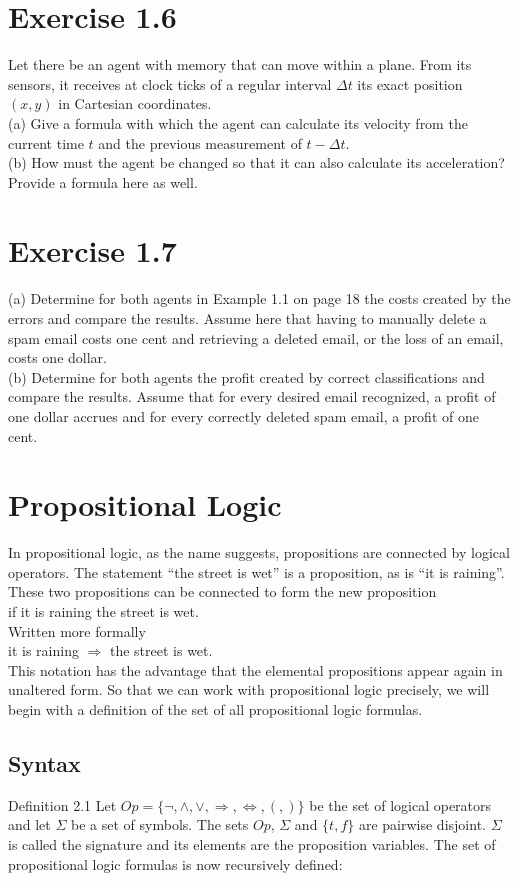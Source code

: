 \documentclass[10pt]{book}
\begin{document}
\section{Exercise 1.6}
Let there be an agent with memory that can move within a plane. From its sensors, it receives at clock ticks of a regular interval $\Delta t$ its exact position $(x, y)$ in Cartesian coordinates.\\
(a) Give a formula with which the agent can calculate its velocity from the current time $t$ and the previous measurement of $t-\Delta t$.\\
(b) How must the agent be changed so that it can also calculate its acceleration? Provide a formula here as well.

\section{Exercise 1.7}
(a) Determine for both agents in Example 1.1 on page 18 the costs created by the errors and compare the results. Assume here that having to manually delete a spam email costs one cent and retrieving a deleted email, or the loss of an email, costs one dollar.\\
(b) Determine for both agents the profit created by correct classifications and compare the results. Assume that for every desired email recognized, a profit of one dollar accrues and for every correctly deleted spam email, a profit of one cent.

\section{Propositional Logic}
In propositional logic, as the name suggests, propositions are connected by logical operators. The statement ``the street is wet'' is a proposition, as is ``it is raining''. These two propositions can be connected to form the new proposition\\
if it is raining the street is wet.\\
Written more formally\\
it is raining $\Rightarrow$ the street is wet.\\
This notation has the advantage that the elemental propositions appear again in unaltered form. So that we can work with propositional logic precisely, we will begin with a definition of the set of all propositional logic formulas.

\subsection{Syntax}
Definition 2.1 Let $Op=\{\neg,\wedge,\vee,\Rightarrow,\Leftrightarrow,(,)\}$ be the set of logical operators and let $\Sigma$ be a set of symbols. The sets $Op$, $\Sigma$ and $\{t,f\}$ are pairwise disjoint. $\Sigma$ is called the signature and its elements are the proposition variables. The set of propositional logic formulas is now recursively defined:
\end{document}
